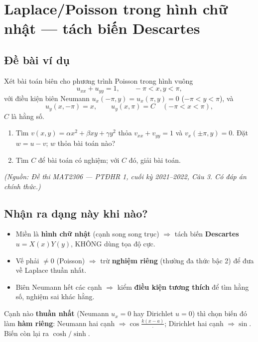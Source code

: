 
\section{Laplace/Poisson trong hình chữ nhật --- tách biến Descartes}

\subsection*{Đề bài ví dụ}

Xét bài toán biên cho phương trình Poisson trong hình vuông
\[
  u_{xx}+u_{yy}=1,\qquad -\pi<x,y<\pi,
\]
với điều kiện biên Neumann $u_x(-\pi,y)=u_x(\pi,y)=0$ ($-\pi<y<\pi$), và
\[
  u_y(x,-\pi)=x,\qquad u_y(x,\pi)=C \quad(-\pi<x<\pi),
\]
$C$ là hằng số.
\begin{enumerate}
\item[(a)] Tìm $v(x,y)=\alpha x^2+\beta xy+\gamma y^2$ thỏa $v_{xx}+v_{yy}=1$ và $v_x(\pm\pi,y)=0$. Đặt $w=u-v$; $w$ thỏa bài toán nào?
\item[(b)] Tìm $C$ để bài toán có nghiệm; với $C$ đó, giải bài toán.
\end{enumerate}

\emph{\small(Nguồn: Đề thi MAT2306 --- PTĐHR 1, cuối kỳ 2021--2022, Câu 3. Có đáp án chính thức.)}

\subsection*{Nhận ra dạng này khi nào?}

\begin{itemize}
\item Miền là \textbf{hình chữ nhật} (cạnh song song trục) $\Rightarrow$ tách biến \textbf{Descartes} $u=X(x)Y(y)$, KHÔNG dùng tọa độ cực.
\item Vế phải $\ne0$ (Poisson) $\Rightarrow$ trừ \textbf{nghiệm riêng} (thường đa thức bậc 2) để đưa về Laplace thuần nhất.
\item Biên Neumann hết các cạnh $\Rightarrow$ kiểm \textbf{điều kiện tương thích} để tìm hằng số, nghiệm sai khác hằng.
\end{itemize}

\begin{meobox}
Cạnh nào \textbf{thuần nhất} (Neumann $u_x=0$ hay Dirichlet $u=0$) thì chọn biến đó làm \textbf{hàm riêng}:
Neumann hai cạnh $\Rightarrow \cos\frac{k(x-a)}{\,\cdot\,}$; Dirichlet hai cạnh $\Rightarrow \sin$. Biến còn lại ra $\cosh/\sinh$.
\end{meobox}

